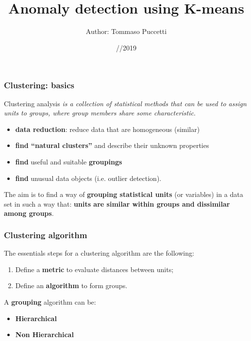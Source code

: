 \documentclass[xcolor ={table,usenames,dvipsnames}]{beamer}
\title{Anomaly detection using K-means}
\author{Author: Tommaso Puccetti}
\institute{Universit\`a  degli Studi di Firenze}
\date{//2019}
\theoremstyle{definition}
\begin{document}
	
	\begin{frame}
		\maketitle
	\end{frame}

	\begin{frame}
		\frametitle{Clustering: basics}
			Clustering analysis \textit{is a collection of statistical methods that can be used to assign units
				to groups, where group members share some characteristic}.  
			
			\begin{itemize}
				\item \textbf{data reduction}: reduce data that are homogeneous (similar)
				\item \textbf{find “natural clusters”} and describe their unknown properties
				\item \textbf{find} useful and suitable \textbf{groupings}
				\item \textbf{find} unusual data objects (i.e. outlier detection).
			\end{itemize}
		
			The aim is to find a way of \textbf{grouping statistical units} (or variables) in a data
			set in such a way that:
			\textbf{units are similar within groups and dissimilar among groups}.
	\end{frame}

	\begin{frame}
		\frametitle{Clustering algorithm}
			The essentials steps for a clustering algorithm are the following:
			
			\begin{enumerate}
				\item Define a \textbf{metric} to evaluate distances between units;
				\item Define an \textbf{algorithm} to form groups. \\
			\end{enumerate}
			
			A \textbf{grouping} algorithm can be:
			\begin{itemize}
				\item \textbf{Hierarchical}
				\item \textbf{Non Hierarchical}
			\end{itemize}	
	\end{frame}
\end{document}
